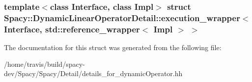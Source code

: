 \subsubsection*{template$<$class Interface, class Impl$>$ struct Spacy\-::\-Dynamic\-Linear\-Operator\-Detail\-::execution\-\_\-wrapper$<$ Interface, std\-::reference\-\_\-wrapper$<$ Impl $>$ $>$}



\-The documentation for this struct was generated from the following file\-:\begin{DoxyCompactItemize}
\item 
/home/travis/build/spacy-\/dev/\-Spacy/\-Spacy/\-Detail/details\-\_\-for\-\_\-dynamic\-Operator.\-hh\end{DoxyCompactItemize}
